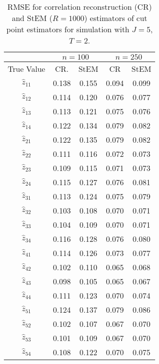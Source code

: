 \documentclass[12pt]{article}
\begin{document}
\begin{table}[tbp]
\begin{center}
\begin{tabular}{|c||c|c||c|c|}
\hline
& \multicolumn{2}{|c||}{$n = 100$} & \multicolumn{2}{|c|}{$n = 250$} \\ 
\hline
True Value & \; \; \; \; CR. \; \; \; \; & StEM & \; \; \; \; CR
\; \; \; \; & StEM \\ \hline
$\hat{z}_{11}$ & 0.138 & 0.155 & 0.094 & 0.099 \\ \hline
$\hat{z}_{12}$ & 0.114 & 0.120 & 0.076 & 0.077 \\ \hline
$\hat{z}_{13}$ & 0.113 & 0.121 & 0.075 & 0.076 \\ \hline
$\hat{z}_{14}$ & 0.122 & 0.134 & 0.079 & 0.082 \\ \hline\hline
$\hat{z}_{21}$ & 0.122 & 0.135 & 0.079 & 0.082 \\ \hline
$\hat{z}_{22}$ & 0.111 & 0.116 & 0.072 & 0.073 \\ \hline
$\hat{z}_{23}$ & 0.109 & 0.115 & 0.071 & 0.073 \\ \hline
$\hat{z}_{24}$ & 0.115 & 0.127 & 0.076 & 0.081 \\ \hline\hline
$\hat{z}_{31}$ & 0.113 & 0.124 & 0.075 & 0.079 \\ \hline
$\hat{z}_{32}$ & 0.103 & 0.108 & 0.070 & 0.071 \\ \hline
$\hat{z}_{33}$ & 0.104 & 0.109 & 0.070 & 0.071 \\ \hline
$\hat{z}_{34}$ & 0.116 & 0.128 & 0.076 & 0.080 \\ \hline\hline
$\hat{z}_{41}$ & 0.114 & 0.126 & 0.073 & 0.077 \\ \hline
$\hat{z}_{42}$ & 0.102 & 0.110 & 0.065 & 0.068 \\ \hline
$\hat{z}_{43}$ & 0.098 & 0.105 & 0.065 & 0.067 \\ \hline
$\hat{z}_{44}$ & 0.111 & 0.123 & 0.070 & 0.074 \\ \hline\hline
$\hat{z}_{51}$ & 0.124 & 0.137 & 0.079 & 0.086 \\ \hline
$\hat{z}_{52}$ & 0.102 & 0.107 & 0.067 & 0.070 \\ \hline
$\hat{z}_{53}$ & 0.101 & 0.109 & 0.067 & 0.070 \\ \hline
$\hat{z}_{54}$ & 0.108 & 0.122 & 0.070 & 0.075 \\ \hline
\end{tabular}%
\end{center}
\caption{RMSE for correlation reconstruction (CR) and StEM ($R=1000$) estimators of cut point estimators for simulation with $J = 5$, $T = 2$.}
\label{FullCutsRMSEJ5T2}
\end{table}
\end{document}
